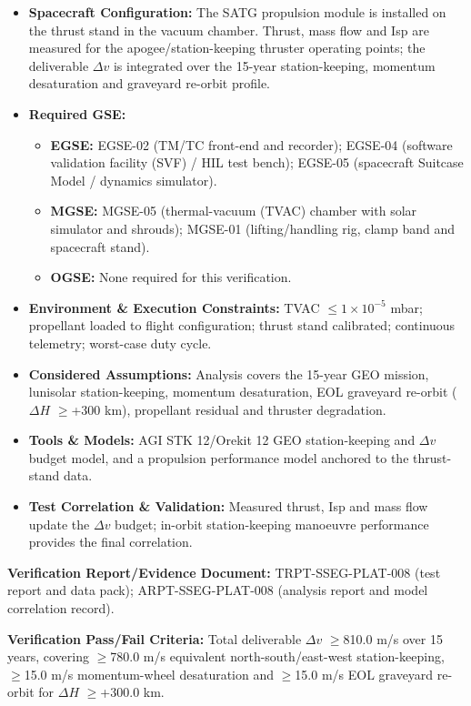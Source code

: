 \begin{itemize}
\item \textbf{Spacecraft Configuration:} The SATG propulsion module is installed on the thrust stand in the vacuum chamber. Thrust, mass flow and Isp are measured for the apogee/station-keeping thruster operating points; the deliverable $\Delta v$ is integrated over the 15-year station-keeping, momentum desaturation and graveyard re-orbit profile.
\item \textbf{Required GSE:}
\begin{itemize}
\item \textbf{EGSE:} EGSE-02 (TM/TC front-end and recorder); EGSE-04 (software validation facility (SVF) / HIL test bench); EGSE-05 (spacecraft Suitcase Model / dynamics simulator).
\item \textbf{MGSE:} MGSE-05 (thermal-vacuum (TVAC) chamber with solar simulator and shrouds); MGSE-01 (lifting/handling rig, clamp band and spacecraft stand).
\item \textbf{OGSE:} None required for this verification.
\end{itemize}
\item \textbf{Environment \& Execution Constraints:} TVAC $\le$$1\times10^{-5}$ mbar; propellant loaded to flight configuration; thrust stand calibrated; continuous telemetry; worst-case duty cycle.
\item \textbf{Considered Assumptions:} Analysis covers the 15-year GEO mission, lunisolar station-keeping, momentum desaturation, EOL graveyard re-orbit ($\Delta H$ $\ge$+300 km), propellant residual and thruster degradation.
\item \textbf{Tools \& Models:} AGI STK 12/Orekit 12 GEO station-keeping and $\Delta v$ budget model, and a propulsion performance model anchored to the thrust-stand data.
\item \textbf{Test Correlation \& Validation:} Measured thrust, Isp and mass flow update the $\Delta v$ budget; in-orbit station-keeping manoeuvre performance provides the final correlation.
\end{itemize}
\par\textbf{Verification Report/Evidence Document:} TRPT-SSEG-PLAT-008 (test report and data pack); ARPT-SSEG-PLAT-008 (analysis report and model correlation record).
\par\textbf{Verification Pass/Fail Criteria:} Total deliverable $\Delta v$ $\ge$810.0 m/s over 15 years, covering $\ge$780.0 m/s equivalent north-south/east-west station-keeping, $\ge$15.0 m/s momentum-wheel desaturation and $\ge$15.0 m/s EOL graveyard re-orbit for $\Delta H$ $\ge$+300.0 km.
\par\medskip
